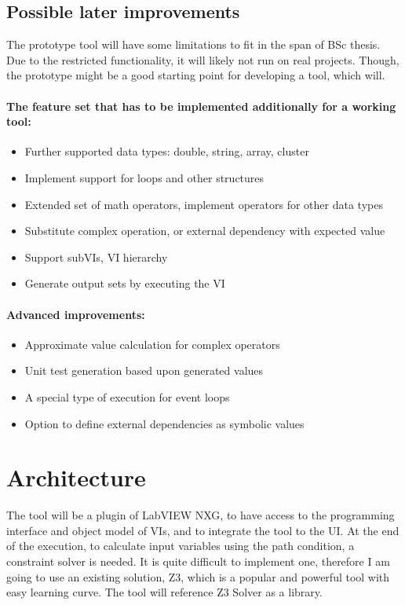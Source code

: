 \subsection{Possible later improvements}

The prototype tool will have some limitations to fit in the span of BSc thesis. Due to the restricted functionality, it will likely not run on real projects. Though, the prototype might be a good starting point for developing a tool, which will.

\paragraph{The feature set that has to be implemented additionally for a working tool:}

\begin{itemize}
  \item Further supported data types: double, string, array, cluster
  \item Implement support for loops and other structures
  \item Extended set of math operators, implement operators for other data types
  \item Substitute complex operation, or external dependency with expected value
  \item Support subVIs, VI hierarchy
   \item Generate output sets by executing the VI
  \end{itemize}
  

\paragraph{Advanced improvements:}

\begin{itemize}
  \item Approximate value calculation for complex operators
  \item Unit test generation based upon generated values
  \item A special type of execution for event loops
  \item Option to define external dependencies as symbolic values
  \end{itemize}

\section{Architecture}

The tool will be a plugin of LabVIEW NXG, to have access to the programming interface and object model of VIs, and to integrate the tool to the UI. At the end of the execution, to calculate input variables using the path condition, a constraint solver is needed. It is quite difficult to implement one, therefore I am going to use an existing solution, Z3, which is a popular and powerful tool with easy learning curve. The tool will reference Z3 Solver as a library.

